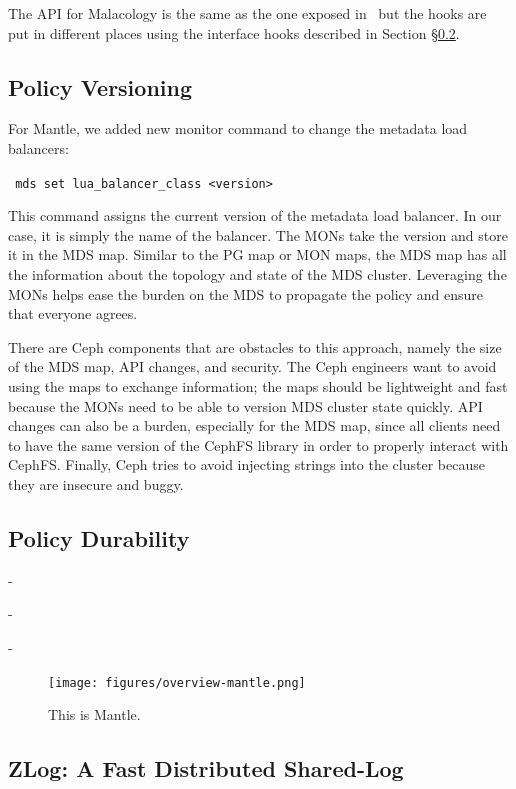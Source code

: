 \documentclass[10pt,twocolumn]{article}
\begin{document}
The API for Malacology is the same as the one exposed in~\cite{sevilla:sc15-mantle} but the hooks are put in different places using the interface hooks described in Section \S\ref{}.

\subsection{Policy Versioning}

For Mantle, we added new monitor command to change the metadata load balancers:

\noindent \texttt{ mds\ set\ lua\_balancer\_class\ \textless{}version\textgreater{}}

This command assigns the current version of the metadata load balancer. In our case, it is simply the name of the balancer. The MONs take the version and store it in the MDS map. Similar to the PG map or MON maps, the MDS map has all the information about the topology and state of the MDS cluster. Leveraging the MONs helps ease the burden on the MDS to propagate the policy and ensure that everyone agrees.

There are Ceph components that are obstacles to this approach, namely the size of the  MDS map, API changes, and security. The Ceph engineers want to avoid using the maps to exchange information; the maps should be lightweight and fast because the MONs need to be able to version MDS cluster state quickly. API changes can also be a burden, especially for the MDS map, since all clients need to have the same version of the CephFS library in order to properly interact with CephFS. Finally, Ceph tries to avoid injecting strings into the cluster because they are insecure and buggy. 

\subsection{Policy Durability}

- 

- 

- 


\begin{figure}[htbp]
\centering
\texttt{[image: figures/overview-mantle.png]}
\caption{This is Mantle.}
\end{figure}

\subsection{ZLog: A Fast Distributed Shared-Log}
\label{sec:zlog}
\end{document}
